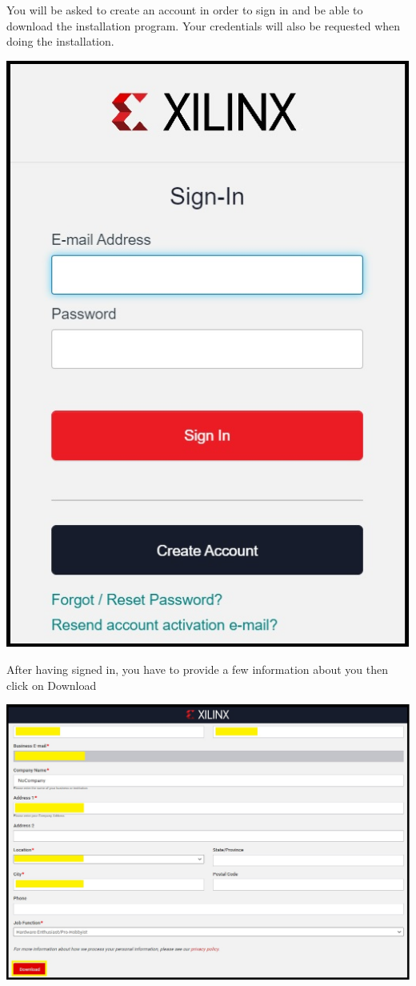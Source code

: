 You will be asked to create an account in order to sign in and be able to download the installation program.
Your credentials will also be requested when doing the installation.

\includegraphics[width=\linewidth]{images/VivadoInstimg004.jpg}

After having signed in, you have to provide a few information about you then click on Download

\includegraphics[width=\linewidth]{images/VivadoInstimg005.jpg}

